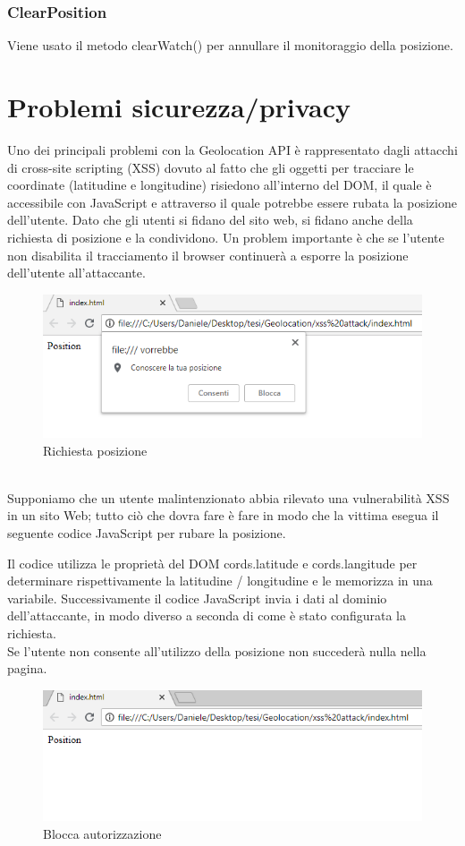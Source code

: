 \documentclass[11pt ,a4paper , twoside , openright ]{article}
\begin{document}
\subsubsection{ClearPosition}
Viene usato il metodo clearWatch() per annullare il monitoraggio della posizione.

\newpage
\section{Problemi sicurezza/privacy}
Uno dei principali problemi con la Geolocation API è rappresentato dagli attacchi di cross-site scripting (XSS) dovuto al fatto che gli oggetti per tracciare le coordinate (latitudine e longitudine) risiedono all'interno del DOM, il quale è accessibile con JavaScript e attraverso il quale potrebbe essere rubata la posizione dell'utente. 
Dato che gli utenti si fidano del sito web, si fidano anche della richiesta di posizione e la condividono.
Un problem importante è che se l'utente non disabilita il tracciamento il browser continuerà a esporre la posizione dell'utente all'attaccante.
\begin{figure}[h]
	\centering
	\includegraphics[width=1\linewidth]{pos1}
	\caption{Richiesta posizione}
	\label{fig: Richiesta posizione}
\end{figure}
\\
Supponiamo che un utente malintenzionato abbia rilevato una vulnerabilità XSS in un sito Web; tutto ciò che dovra fare è fare in modo che la vittima esegua il seguente codice JavaScript per rubare la posizione.

Il codice utilizza le proprietà del DOM cords.latitude e cords.langitude per determinare rispettivamente la latitudine / longitudine e le memorizza in una variabile. Successivamente il codice JavaScript invia i dati al dominio dell'attaccante, in modo diverso a seconda di come è stato configurata la richiesta.
\pagebreak
\\
Se l'utente non consente all'utilizzo della posizione non succederà nulla nella pagina.
\begin{figure}[h]
	\centering
	\includegraphics[width=1\linewidth]{Blocca}
	\caption{Blocca autorizzazione}
	\label{fig: Blocca autorizzazione}
\end{figure}
\end{document}
